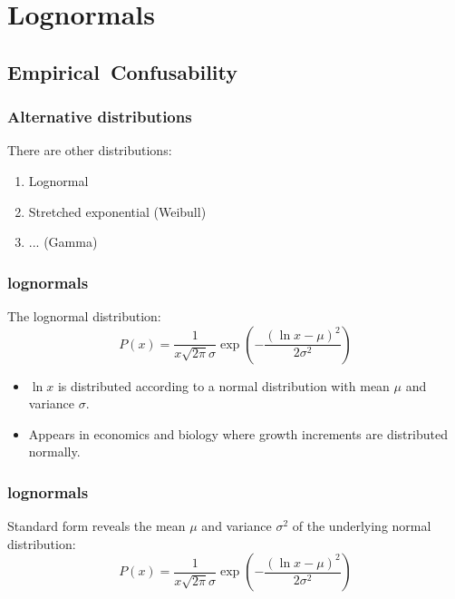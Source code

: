 \section{Lognormals}

\subsection{Empirical\ Confusability}

\begin{frame}
  \frametitle{Alternative distributions}

  \begin{block}{There are other  distributions:}
    \begin{enumerate}
    \item Lognormal
    \item Stretched exponential (Weibull)
    \item ... (Gamma)
    \end{enumerate}
  \end{block}

\end{frame}

\begin{frame}
  \frametitle{lognormals}

  \begin{block}{The lognormal distribution:}
    $$
    P(x) = \frac{1}{x \sqrt{2\pi} \sigma}
    \exp 
    \left(
      -\frac{(\ln x-\mu)^2}
      {2\sigma^2}
    \right)
    $$
  \end{block}

  \begin{itemize}
  \item $\ln x$ is distributed according 
    to a normal distribution with mean $\mu$ and variance $\sigma$.
  \item Appears in economics and biology where 
    growth increments are distributed normally.
  \end{itemize}

\end{frame}

\begin{frame}
  \frametitle{lognormals}

  Standard form reveals the mean $\mu$ and
  variance $\sigma^2$ of the underlying 
  normal distribution:
  $$
  P(x) = \frac{1}{x \sqrt{2\pi} \sigma}
  \exp 
  \left(
    -\frac{(\ln x-\mu)^2}
    {2\sigma^2}
  \right)
  $$


\end{frame}

